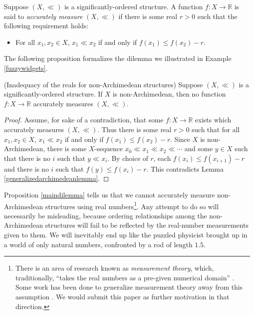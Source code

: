 \documentclass[twoside,11pt]{article}
\begin{document}
\begin{definition}
    Suppose $(X,\ll)$ is a significantly-ordered structure.
    A function $f:X\to\mathbb R$ is said to \emph{accurately measure $(X,\ll)$}
    if there is some real $r>0$ such that the following requirement holds:
    \begin{itemize}
        \item
        For all $x_1,x_2\in X$, $x_1\ll x_2$ if and only if
        $f(x_1)\leq f(x_2)-r$.
    \end{itemize}
\end{definition}

The following proposition formalizes the dilemma we illustrated in
Example \ref{fuzzywidgets}.

\begin{proposition}
\label{maindilemma}
(Inadequacy of the reals for non-Archimedean structures)
    Suppose $(X,\ll)$ is a significantly-ordered structure.
    If $X$ is non-Archimedean, then no function $f:X\to\mathbb R$
    accurately measures $(X,\ll)$.
\end{proposition}

\begin{proof}
    Assume, for sake of a contradiction, that some $f:X\to\mathbb R$
    exists which accurately measures $(X,\ll)$. Thus there is some real $r>0$ such that
    for all $x_1,x_2\in X$, $x_1\ll x_2$ if and only if $f(x_1)\leq f(x_2)-r$.
    Since $X$ is non-Archimedean, there is some $X$-sequence
    $x_0\ll x_1\ll x_2\ll\cdots$ and some $y\in X$
    such that there is no $i$ such that $y\ll x_i$.
    By choice of $r$, each $f(x_{i})\leq f(x_{i+1})-r$ and there is no
    $i$ such that $f(y)\leq f(x_i)-r$.
    This contradicts Lemma \ref{generalizedarchimedeanlemma}.
\end{proof}

Proposition \ref{maindilemma} tells us that we cannot accurately measure
non-Archimedean structures using real numbers\footnote{There is an area of research
known as \emph{measurement theory}, which, traditionally,
``takes the real numbers as a pre-given numerical domain'' \citep{niederee1992numbers}.
Some work has been done to generalize measurement theory away from this assumption
\citep{narens1974, skala1975, rizza2016divergent}.
We would submit this paper as further motivation in that direction.}.
Any attempt to do so will necessarily be misleading, because ordering
relationships among the non-Archimedean structures will fail to be reflected
by the real-number measurements given to them.
We will inevitably end up like the puzzled physicist
brought up in a world of only natural numbers, confronted by a rod of
length $1.5$.
\end{document}
